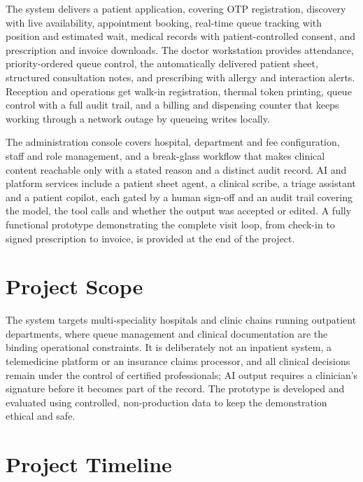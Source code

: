 \documentclass[12pt,a4paper]{article}
\begin{document}
The system delivers a patient application, covering OTP registration, discovery with live availability, appointment booking, real-time queue tracking with position and estimated wait, medical records with patient-controlled consent, and prescription and invoice downloads. The doctor workstation provides attendance, priority-ordered queue control, the automatically delivered patient sheet, structured consultation notes, and prescribing with allergy and interaction alerts. Reception and operations get walk-in registration, thermal token printing, queue control with a full audit trail, and a billing and dispensing counter that keeps working through a network outage by queueing writes locally.

The administration console covers hospital, department and fee configuration, staff and role management, and a break-glass workflow that makes clinical content reachable only with a stated reason and a distinct audit record. AI and platform services include a patient sheet agent, a clinical scribe, a triage assistant and a patient copilot, each gated by a human sign-off and an audit trail covering the model, the tool calls and whether the output was accepted or edited. A fully functional prototype demonstrating the complete visit loop, from check-in to signed prescription to invoice, is provided at the end of the project.

\section{Project Scope}

The system targets multi-speciality hospitals and clinic chains running outpatient departments, where queue management and clinical documentation are the binding operational constraints. It is deliberately not an inpatient system, a telemedicine platform or an insurance claims processor, and all clinical decisions remain under the control of certified professionals; AI output requires a clinician's signature before it becomes part of the record. The prototype is developed and evaluated using controlled, non-production data to keep the demonstration ethical and safe.

\section{Project Timeline}
\end{document}
